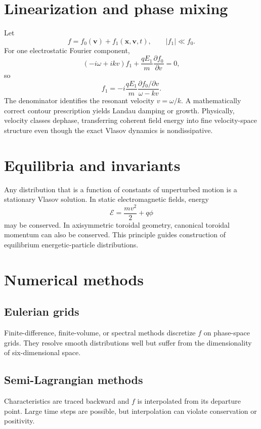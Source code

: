 \documentclass[11pt]{article}
\begin{document}
\section{Linearization and phase mixing}
Let
\begin{equation}
f=f_0(\mathbf v)+f_1(\mathbf x,\mathbf v,t),
\qquad |f_1|\ll f_0.
\end{equation}
For one electrostatic Fourier component,
\begin{equation}
(-i\omega+ikv)f_1+
\frac{qE_1}{m}\frac{\partial f_0}{\partial v}=0,
\end{equation}
so
\begin{equation}
f_1=-i\frac{qE_1}{m}
\frac{\partial f_0/\partial v}{\omega-kv}.
\end{equation}
The denominator identifies the resonant velocity $v=\omega/k$. A mathematically correct contour prescription yields Landau damping or growth. Physically, velocity classes dephase, transferring coherent field energy into fine velocity-space structure even though the exact Vlasov dynamics is nondissipative.

\section{Equilibria and invariants}
Any distribution that is a function of constants of unperturbed motion is a stationary Vlasov solution. In static electromagnetic fields, energy
\begin{equation}
\mathcal E=\frac{mv^2}{2}+q\phi
\end{equation}
may be conserved. In axisymmetric toroidal geometry, canonical toroidal momentum can also be conserved. This principle guides construction of equilibrium energetic-particle distributions.

\section{Numerical methods}
\subsection{Eulerian grids}
Finite-difference, finite-volume, or spectral methods discretize $f$ on phase-space grids. They resolve smooth distributions well but suffer from the dimensionality of six-dimensional space.

\subsection{Semi-Lagrangian methods}
Characteristics are traced backward and $f$ is interpolated from its departure point. Large time steps are possible, but interpolation can violate conservation or positivity.
\end{document}
